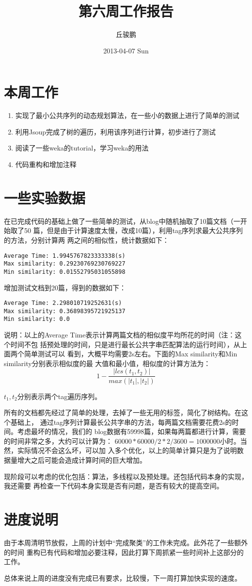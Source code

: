 \documentclass[a4paper]{article}
\title{第六周工作报告}
\author{丘骏鹏}
\date{2013-04-07 Sun}
\begin{document}
\maketitle

\setcounter{tocdepth}{3}
\tableofcontents
\vspace*{1cm}


\section{本周工作}
\label{sec-1}

\begin{enumerate}
\item 实现了最小公共序列的动态规划算法，在一些小的数据上进行了简单的测试
\item 利用Jsoup完成了树的遍历，利用该序列进行计算，初步进行了测试
\item 阅读了一些weka的tutorial，学习weka的用法
\item 代码重构和增加注释
\end{enumerate}
\section{一些实验数据}
\label{sec-2}

在已完成代码的基础上做了一些简单的测试，从blog中随机抽取了10篇文档（一开始取了50
篇，但是由于计算速度太慢，改成10篇），利用tag序列求最大公共序列的方法，分别计算两
两之间的相似性，统计数据如下：

\begin{verbatim}
Average Time: 1.9945767823333338(s)
Max similarity: 0.29230769230769227
Min similarity: 0.01552795031055898
\end{verbatim}

增加测试文档到20篇，得到的数据如下：

\begin{verbatim}
Average Time: 2.298010719252631(s)
Max similarity: 0.36898395721925137
Min similarity: 0.0
\end{verbatim}

说明：以上的Average Time表示计算两篇文档的相似度平均所花的时间（注：这个时间不包
括预处理的时间，只是进行最长公共字串匹配算法的运行时间），从上面两个简单测试可以
看到，大概平均需要2s左右。下面的Max similarity和Min similarity分别表示相似度的最
大值和最小值，相似度的计算方法为：\[ 1-\frac{|lcs(t_1, t_2)|}{max(|t_1|, |t_2|)}
\]

\(t_1,t_2\)分别表示两个tag遍历序列。

所有的文档都先经过了简单的处理，去掉了一些无用的标签，简化了树结构。在这个基础上，
通过tag序列计算最长公共字串的方法，每两篇文档需要花费2s的时间。考虑最坏的情况，我们的
blog数据有59998篇，如果每两篇都进行计算，需要的时间非常之多，大约可以计算为：
\(60000 * 60000 / 2 * 2 / 3600 = 1000000\)小时。当然，实际情况不会这么坏，可以加
入多个优化，以上的简单计算只是为了说明数据量增大之后可能会造成计算时间的巨大增加。

现阶段可以考虑的优化包括：算法，多线程以及预处理。还包括代码本身的实现，我还需要
再检查一下代码本身实现是否有问题，是否有较大的提高空间。
\section{进度说明}
\label{sec-3}

由于本周清明节放假，上周的计划中“完成聚类”的工作未完成。此外花了一些额外的时间
重构已有代码和增加必要注释，因此打算下周抓紧一些时间补上这部分的工作。

总体来说上周的进度没有完成已有要求，比较慢，下一周打算加快实现的速度。
\end{document}
